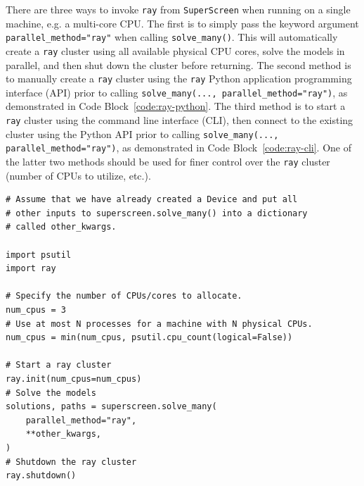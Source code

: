 \documentclass[final,3p,times]{elsarticle}
\newcommand{\inline}[1]{\texttt{#1}\xspace}
\newcommand{\SuperScreen}{\inline{SuperScreen}}
\newenvironment{code}{\captionsetup{type=listing}}{\hfill}
\begin{document}
There are three ways to invoke \inline{ray} from \SuperScreen when running on a single machine, e.g. a multi-core CPU. The first is to simply pass the keyword argument \inline{parallel_method="ray"} when calling \inline{solve_many()}. This will automatically create a \inline{ray} cluster using all available physical CPU cores, solve the models in parallel, and then shut down the cluster before returning. The second method is to manually create a \inline{ray} cluster using the \inline{ray} Python application programming interface (API) prior to calling \inline{solve_many(..., parallel_method="ray")}, as demonstrated in Code Block~\ref{code:ray-python}. The third method is to start a \inline{ray} cluster using the command line interface (CLI), then connect to the existing cluster using the Python API prior to calling \inline{solve_many(..., parallel_method="ray")}, as demonstrated in Code Block~\ref{code:ray-cli}. One of the latter two methods should be used for finer control over the \inline{ray} cluster (number of CPUs to utilize, etc.).

\begin{code}
\begin{verbatim}
# Assume that we have already created a Device and put all
# other inputs to superscreen.solve_many() into a dictionary
# called other_kwargs.

import psutil
import ray

# Specify the number of CPUs/cores to allocate.
num_cpus = 3
# Use at most N processes for a machine with N physical CPUs.
num_cpus = min(num_cpus, psutil.cpu_count(logical=False))

# Start a ray cluster
ray.init(num_cpus=num_cpus)
# Solve the models
solutions, paths = superscreen.solve_many(
    parallel_method="ray",
    **other_kwargs,
)
# Shutdown the ray cluster
ray.shutdown()
\end{verbatim}
\end{code}
\end{document}
